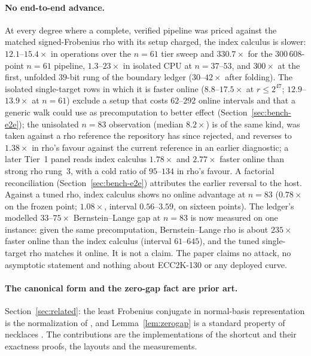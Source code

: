 \paragraph{No end-to-end advance.}
At every degree where a complete, verified pipeline was priced against
the matched signed-Frobenius rho with its setup charged, the index
calculus is slower: $12.1$--$15.4\times$ in operations over the
$n=61$ tier sweep and $330.7\times$ for the $300\,608$-point $n=61$
pipeline, $1.3$--$23\times$ in isolated CPU at $n=37$--$53$, and
$300\times$ at the first, unfolded $39$-bit rung of the boundary
ledger ($30$--$42\times$ after folding). The isolated single-target
rows in which it is faster online ($8.8$--$17.5\times$ at
$r\le2^{47}$; $12.9$--$13.9\times$ at $n=61$) exclude a setup that
costs $62$--$292$ online intervals and that a generic walk could use
as precomputation to better effect (Section~\ref{sec:bench-e2e}); the
unisolated $n=83$ observation (median $8.2\times$) is of the same kind,
was taken against a rho reference the repository has since rejected,
and reverses to $1.38\times$ in rho's favour against the current
reference in an earlier diagnostic; a later Tier~1 panel reads index
calculus $1.78\times$ and $2.77\times$ faster online than strong rho
rung~3, with a cold ratio of $95$--$134$ in rho's favour. A factorial
reconciliation (Section~\ref{sec:bench-e2e}) attributes the earlier
reversal to the host. Against a tuned rho, index calculus shows no online
advantage at $n=83$ ($0.78\times$ on the frozen point; $1.08\times$,
interval $0.56$--$3.59$, on sixteen points). The ledger's modelled
$33$--$75\times$ Bernstein--Lange gap at $n=83$ is now measured on one
instance: given the same precomputation, Bernstein--Lange rho is about
$235\times$ faster online than the index calculus (interval $61$--$645$),
and the tuned single-target rho matches it online. It is not a claim. The paper claims no attack, no asymptotic statement and nothing
about ECC2K-130 or any deployed curve.

\paragraph{The canonical form and the zero-gap fact are prior art.}
Section~\ref{sec:related}: the least Frobenius conjugate in normal-basis
representation is the normalization of \citet{bailey2009}, and
Lemma~\ref{lem:zerogap} is a standard property of necklaces
\citep{ruskeysawada1999,gabricsawada2026}. The contributions are the
implementations of the shortcut and their exactness proofs, the
layouts and the measurements.

